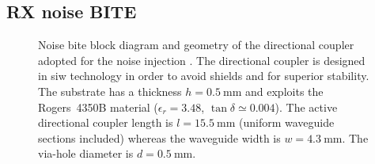 \documentclass[conference,10pt,a4paper]{IEEEtran}%
\begin{document}
\subsection{RX noise BITE}
\label{sec-RX-noise-bite}
\begin{figure}[tb]
	\centering
	\caption{Noise \acrshort{bite} block diagram \protect{} and geometry of the directional coupler adopted for the noise injection \protect{}.
	The directional coupler is designed in \acrshort{siw} technology in order to avoid shields and for superior stability.
	The substrate has a thickness $h=\SI{0.5}{\milli\metre}$ and exploits the Rogers~4350B material ($\epsilon_{r}=3.48$, $\tan \delta \simeq 0.004$).
	The active directional coupler length is $l=\SI{15.5}{\mm}$ (uniform waveguide sections included) whereas the waveguide width is $w=\SI{4.3}{\mm}$.
	The via-hole diameter is $d=\SI{0.5}{\mm}$. }
	\label{fig-nbite-geo}
\end{figure}
\end{document}
